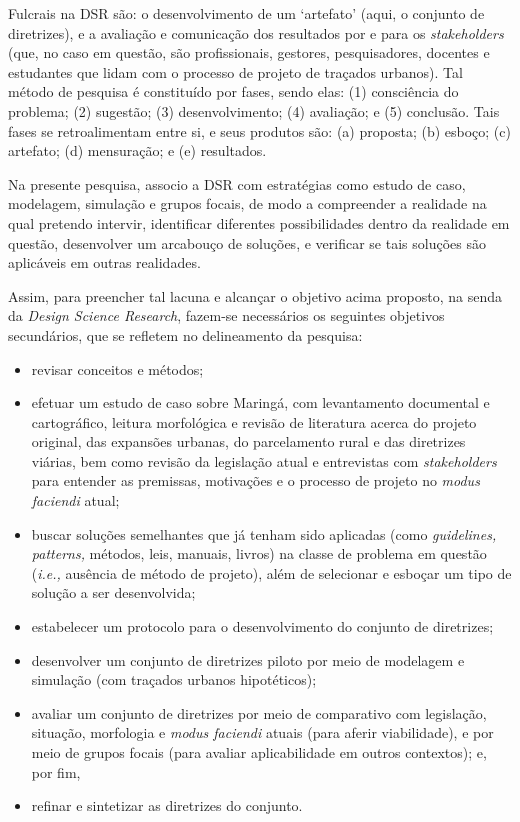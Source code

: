 \documentclass[]{report}
\begin{document}
	Fulcrais na DSR são: o desenvolvimento de um `artefato' (aqui, o conjunto de diretrizes), e a avaliação e comunicação dos resultados por e para os \textit{stakeholders} (que, no caso em questão, são profissionais, gestores, pesquisadores, docentes e estudantes que lidam com o processo de projeto de traçados urbanos). Tal método de pesquisa é constituído por fases, sendo elas: (1) consciência do problema; (2) sugestão; (3) desenvolvimento; (4) avaliação; e (5) conclusão. Tais fases se retroalimentam entre si, e seus produtos são: (a) proposta; (b) esboço; (c) artefato; (d) mensuração; e (e) resultados.
	
	Na presente pesquisa, associo a DSR com estratégias como estudo de caso, modelagem, simulação e grupos focais, de modo a compreender a realidade na qual pretendo intervir, identificar diferentes possibilidades dentro da realidade em questão, desenvolver um arcabouço de soluções, e verificar se tais soluções são aplicáveis em outras realidades.

	Assim, para preencher tal lacuna e alcançar o objetivo acima proposto, na senda da \textit{Design Science Research}, fazem-se necessários os seguintes objetivos secundários, que se refletem no delineamento da pesquisa: 
	\begin{itemize}
		\item revisar conceitos e métodos; 
		\item efetuar um estudo de caso sobre Maringá, com levantamento documental e cartográfico, leitura morfológica e revisão de literatura acerca do projeto original, das expansões urbanas, do parcelamento rural e das diretrizes viárias, bem como revisão da legislação atual e entrevistas com \textit{stakeholders} para entender as premissas, motivações e o processo de projeto no \textit{modus faciendi} atual; 
		\item buscar soluções semelhantes que já tenham sido aplicadas (como \textit{guidelines, patterns,} métodos, leis, manuais, livros) na classe de problema em questão (\textit{i.e.,} ausência de método de projeto), além de selecionar e esboçar um tipo de solução a ser desenvolvida;
		\item estabelecer um protocolo para o desenvolvimento do conjunto de diretrizes; 
		\item desenvolver um conjunto de diretrizes piloto por meio de modelagem e simulação (com traçados urbanos hipotéticos); 
		\item avaliar um conjunto de diretrizes por meio de comparativo com legislação, situação, morfologia e \textit{modus faciendi} atuais (para aferir viabilidade), e por meio de grupos focais (para avaliar aplicabilidade em outros contextos); e, por fim, 
		\item refinar e sintetizar as diretrizes do conjunto.
	\end{itemize}
\end{document}
